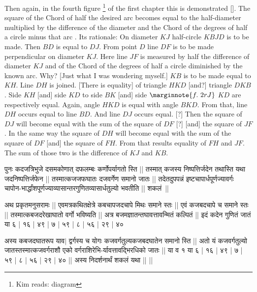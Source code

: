 \documentclass[12pt]{book}
\begin{document}
\newpage

Then again, in the fourth figure \footnote{Kim reads: diagram} of the first chapter this is demonstrated []. 
The square of the Chord of half the desired arc  becomes
equal to the half-diameter 
multiplied by the difference of the 
diameter and the Chord of the degrees of half a circle minus that arc .
Its rationale: On diameter $KJ$ 
half-circle $KBJD$ is to be made.  Then $BD$ is equal to $DJ$. From point $D$
line $DF$ is to be made perpendicular on diameter $KJ$.  Here line $JF$ is measured
by half the difference of 
diameter $KJ$ and of the Chord of the degrees of half a circle diminished by
the known arc.  Why?  [Just what I was wondering myself.] 
$KB$ is to be made equal to $KH$. Line $DH$ is joined.  [There is equality] of triangle
$HKD$ [and?] triangle $DKB$. Side $KH$ [and] side $KD$ to side $BK$
[and] side
$ \marginnote{f.~2r J}$
$KD$ are respectively equal. 
Again, angle $HKD$ is equal with angle $BKD$. From that, line $DH$ occurs equal
to line $BD$.  And line $DJ$ occurs equal. [?] Then the square of $DJ$ will become 
equal with the sum of the square of $DF$ [?] [and] the square of $JF$. In the 
same way  the 
square of $DH$ will become equal with the sum of the square of $DF$ [and]
the square of $FH$.  From that results equality of $FH$ and $JF$.  The sum of 
those two is the difference of $KJ$ and $KB$. 

\newpage

{\s पुनः कदजत्रिभुजे दसमकोणात् दफलम्बः कर्णोपर्यागतो स्ति ||
तस्मात् कजस्य निष्पत्तिर्जदेन तथास्ति
यथा जदनिष्पत्तिर्जफेन || तस्मात्कजजफघातः दजवर्गेण समानो जातः ||
तदेतदुपपन्नं इष्टचापार्धपूर्णज्यावर्गः चापोन-भार्द्धांशपूर्णज्याव्यासान्तरगुणितव्यासार्धतुल्यो भवतीति ||
शकलं~||}

\vskip15pt

{\s अथ प्रकृतमनुसरामः ||
एवमत्रकथितक्षेत्रे कबचापजदचापे मिथः समाने स्तः ||
एवं कजबदचापे च समाने स्तः || तस्मात्कबजदरेखाघातो वर्गो भविष्यति ||
अत्र बजमज्ञातन्तघावत्तावन्मितं कल्पितं || इदं कदेन गुणितं जातं या
६ | १६ | ४९ | ७ | ५९ | ८ | ५६ | २९ | ४०}

\vskip15pt

{\s [क्षेत्र]}

\vskip15pt

{\s अस्य कबजदघातरूप याव$|$%
द्वर्गस्य च योगः
कजवर्गतुल्यकजबदघातेन समानो स्ति || अतो यं कजवर्गतुल्यो जातस्तस्मात्कजवर्गराशौ एको
वर्गराशिरेभि-र्यावत्तावद्भिरधिको जातः ||
या व १ या ६ | १६ | ४९ | ७ | ५९ | ८ | ५६ | २९ | ४० ||
अस्य
निदर्शनार्थं शकलं यथा || ||} \\
\end{document}
